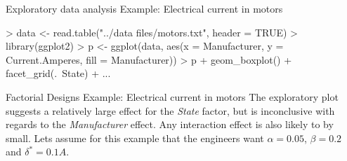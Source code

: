 \documentclass[t]{beamer}
\begin{document}

\begin{ftstf}
{Exploratory data analysis}
{Example: Electrical current in motors}
\begin{rcode}
> data <- read.table("../data files/motors.txt", header = TRUE)
> library(ggplot2)
> p <- ggplot(data, aes(x = Manufacturer, y = Current.Amperes, 
                        fill = Manufacturer))
> p + geom_boxplot() + facet_grid(.~State) + ...
\end{rcode}

\end{ftstf}


\begin{ftst}
{Factorial Designs}
{Example: Electrical current in motors}
The exploratory plot suggests a relatively large effect for the \textit{State} factor, but is inconclusive with regards to the \textit{Manufacturer} effect. Any interaction effect is also likely to by small.
\vhalf
Lets assume for this example that the engineers want $\alpha = 0.05$, $\beta = 0.2$ and $\delta^* = 0.1 A$.
\end{ftst}
\end{document}
